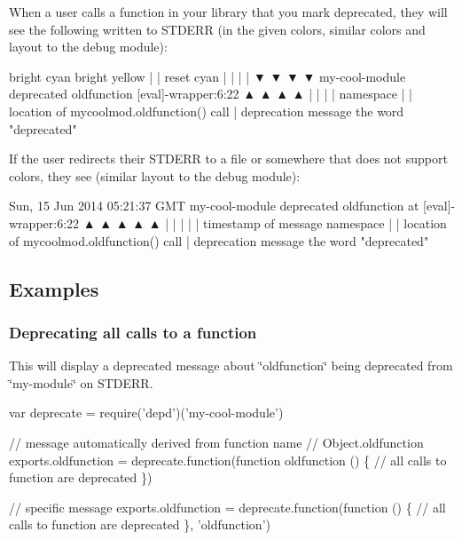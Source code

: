 When a user calls a function in your library that you mark deprecated, they will see the following written to S\+T\+D\+E\+RR (in the given colors, similar colors and layout to the {\ttfamily debug} module)\+:


\begin{DoxyCode}
bright cyan    bright yellow
|              |          reset       cyan
|              |          |           |
▼              ▼          ▼           ▼
my-cool-module deprecated oldfunction [eval]-wrapper:6:22
▲              ▲          ▲           ▲
|              |          |           |
namespace      |          |           location of mycoolmod.oldfunction() call
               |          deprecation message
               the word "deprecated"
\end{DoxyCode}


If the user redirects their S\+T\+D\+E\+RR to a file or somewhere that does not support colors, they see (similar layout to the {\ttfamily debug} module)\+:


\begin{DoxyCode}
Sun, 15 Jun 2014 05:21:37 GMT my-cool-module deprecated oldfunction at [eval]-wrapper:6:22
▲                             ▲              ▲          ▲              ▲
|                             |              |          |              |
timestamp of message          namespace      |          |             location of mycoolmod.oldfunction()
       call
                                             |          deprecation message
                                             the word "deprecated"
\end{DoxyCode}


\subsection*{Examples}

\subsubsection*{Deprecating all calls to a function}

This will display a deprecated message about \char`\"{}oldfunction\char`\"{} being deprecated from \char`\"{}my-\/module\char`\"{} on S\+T\+D\+E\+RR.


\begin{DoxyCode}
var deprecate = require('depd')('my-cool-module')

// message automatically derived from function name
// Object.oldfunction
exports.oldfunction = deprecate.function(function oldfunction () \{
  // all calls to function are deprecated
\})

// specific message
exports.oldfunction = deprecate.function(function () \{
  // all calls to function are deprecated
\}, 'oldfunction')
\end{DoxyCode}


